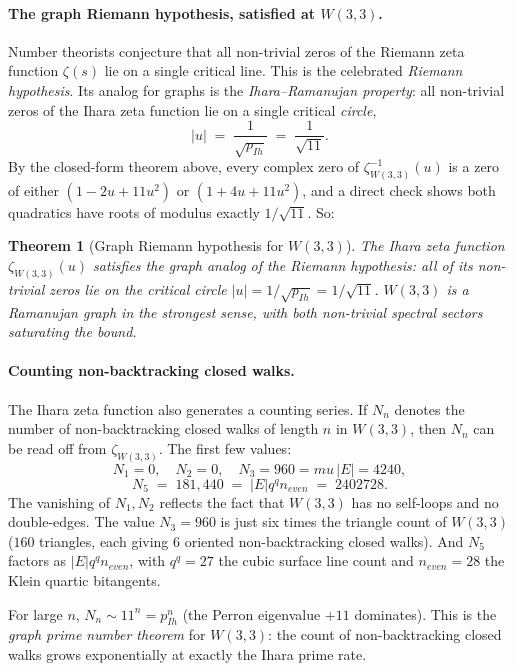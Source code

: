 \documentclass[11pt]{article}
\def\mathrm#1{#1}%
\def\text#1{#1}%
\def\mu{mu}%
\def\cdot{ }%
\newtheorem*{theorem}{Theorem}
\begin{document}
\paragraph{The graph Riemann hypothesis, satisfied at $W(3,3)$.}
Number theorists conjecture that all non-trivial zeros of the
Riemann zeta function $\zeta(s)$ lie on a single critical line.  This
is the celebrated \emph{Riemann hypothesis}.  Its analog for graphs
is the \emph{Ihara--Ramanujan property}: all non-trivial zeros of the
Ihara zeta function lie on a single critical \emph{circle},
\[
|u| \;=\; \frac{1}{\sqrt{p_{\mathrm{Ih}}}} \;=\; \frac{1}{\sqrt{11}}.
\]
By the closed-form theorem above, every complex zero of
$\zeta_{W(3,3)}^{-1}(u)$ is a zero of either $(1 - 2u + 11u^2)$ or
$(1 + 4u + 11u^2)$, and a direct check shows both quadratics have
roots of modulus exactly $1/\sqrt{11}$.  So:

\begin{theorem}[Graph Riemann hypothesis for $W(3,3)$]
The Ihara zeta function $\zeta_{W(3,3)}(u)$ satisfies the graph
analog of the Riemann hypothesis: all of its non-trivial zeros lie on
the critical circle $|u| = 1/\sqrt{p_{\mathrm{Ih}}} = 1/\sqrt{11}$.
$W(3,3)$ is a Ramanujan graph in the strongest sense, with both
non-trivial spectral sectors saturating the bound.
\end{theorem}

\paragraph{Counting non-backtracking closed walks.}
The Ihara zeta function also generates a counting series.  If $N_n$
denotes the number of non-backtracking closed walks of length $n$ in
$W(3,3)$, then $N_n$ can be read off from $\zeta_{W(3,3)}$.  The first
few values:
\[
N_1 = 0,\quad N_2 = 0,\quad
N_3 = 960 = \mu\,|E| = 4 \cdot 240,
\]
\[
N_5 \;=\; 181{,}440 \;=\; |E| \cdot q^q \cdot n_{\text{even}}
         \;=\; 240 \cdot 27 \cdot 28.
\]
The vanishing of $N_1, N_2$ reflects the fact that $W(3,3)$ has no
self-loops and no double-edges.  The value $N_3 = 960$ is just
six times the triangle count of $W(3,3)$ ($160$ triangles, each
giving $6$ oriented non-backtracking closed walks).  And $N_5$ factors
as $|E| \cdot q^q \cdot n_{\text{even}}$, with $q^q = 27$ the cubic
surface line count and $n_{\text{even}} = 28$ the Klein quartic
bitangents.

For large $n$, $N_n \sim 11^n = p_{\mathrm{Ih}}^n$ (the Perron
eigenvalue $+11$ dominates).  This is the \emph{graph prime number
theorem} for $W(3,3)$: the count of non-backtracking closed walks
grows exponentially at exactly the Ihara prime rate.
\end{document}

